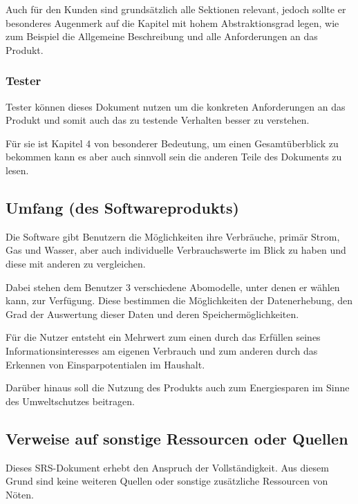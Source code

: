Auch für den Kunden sind grundsätzlich alle Sektionen relevant, jedoch sollte er besonderes Augenmerk auf die Kapitel mit hohem Abstraktionsgrad legen, 
wie zum Beispiel die Allgemeine Beschreibung und alle Anforderungen an das Produkt.

\subsubsection{Tester}

Tester können dieses Dokument nutzen um die konkreten Anforderungen an das Produkt und somit auch das zu testende Verhalten besser zu verstehen. 

Für sie ist Kapitel 4 von besonderer Bedeutung, um einen Gesamtüberblick zu bekommen kann es aber auch sinnvoll sein die anderen Teile des Dokuments zu lesen.

\subsection{Umfang (des Softwareprodukts)}

Die Software gibt Benutzern die Möglichkeiten ihre Verbräuche, primär Strom, Gas und Wasser, aber auch individuelle Verbrauchswerte im Blick zu haben und diese mit anderen zu vergleichen.

Dabei stehen dem Benutzer 3 verschiedene Abomodelle, unter denen er wählen kann, zur Verfügung. 
Diese bestimmen die Möglichkeiten der Datenerhebung, den Grad der Auswertung dieser Daten und deren Speichermöglichkeiten.

Für die Nutzer entsteht ein Mehrwert zum einen durch das Erfüllen seines Informationsinteresses am eigenen Verbrauch und zum anderen durch das Erkennen von Einsparpotentialen im Haushalt.

Darüber hinaus soll die Nutzung des Produkts auch zum Energiesparen im Sinne des Umweltschutzes beitragen.

\subsection{Verweise auf sonstige Ressourcen oder Quellen}

Dieses SRS-Dokument erhebt den Anspruch der Vollständigkeit. Aus diesem Grund sind keine weiteren Quellen oder sonstige zusätzliche Ressourcen von Nöten.
